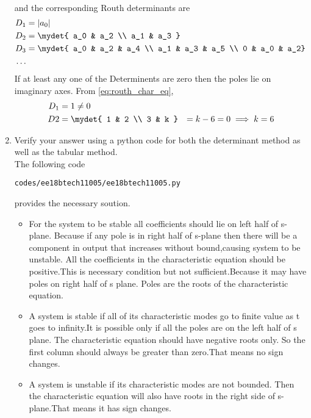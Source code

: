\begin{enumerate}[label=\thesection.\arabic*.,ref=\thesection.\theenumi]
\begin{align}
\end{align}
and the corresponding Routh determinants are
\begin{align}
D_1 &= |a_0|
\\
D_2 &= 
\mydet{
a_0 & a_2 
\\ 
a_1 & a_3
} 
\\
D_3 &=\mydet{
a_0 & a_2 & a_4 
\\ a_1 & a_3 & a_5 
\\ 0 & a_0 & a_2}
\\
\dots
\end{align}
If at least any one of the Determinents are zero then the poles lie on imaginary axes.  From \eqref{eq:routh_char_eq},
%
\begin{align}
D_1 &= 1 \ne 0
\\
D2 &= \mydet{
1 & 2 \\ 3 & k } 
&= k-6 =0 \implies k = 6
\end{align}
%
\item Verify your answer using a python code for both the determinant method as well as the tabular method.
\\
\solution 
The following code 
%
\begin{lstlisting}
codes/ee18btech11005/ee18btech11005.py
\end{lstlisting}
%
provides the necessary soution.
\begin{itemize}
\item  For the system to be stable all coefficients should lie on left half of s-plane. Because if any pole is in right half of s-plane then there will be a component in output that increases without bound,causing system to be unstable.
All the coefficients in the characteristic equation should be positive.This is necessary condition but not sufficient.Because it may have poles on right half of s plane.
Poles are the roots of the characteristic equation.
    \item A system is stable if all of its characteristic modes go to finite value as t goes to infinity.It is possible only if all the poles are on the left half of s plane.
    The characteristic equation should have negative roots only. So the first column should always be greater than zero.That means no sign changes.
    \item A system is unstable if its characteristic modes are not bounded. Then the characteristic equation will also have roots in the right side of s-plane.That means it has sign changes.
    \end{itemize}

\end{enumerate}


